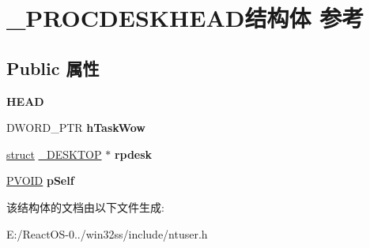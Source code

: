 \hypertarget{struct___p_r_o_c_d_e_s_k_h_e_a_d}{}\section{\+\_\+\+P\+R\+O\+C\+D\+E\+S\+K\+H\+E\+A\+D结构体 参考}
\label{struct___p_r_o_c_d_e_s_k_h_e_a_d}
\subsection*{Public 属性}
\begin{DoxyCompactItemize}
\item 
\mbox{\label{struct___p_r_o_c_d_e_s_k_h_e_a_d_a9e86ada3b28f85a06ca00e51e39e6fd1}} 
{\bfseries H\+E\+AD}
\item 
\mbox{\label{struct___p_r_o_c_d_e_s_k_h_e_a_d_a5e12ebcabd0f3be1d2986b40efa935cb}} 
D\+W\+O\+R\+D\+\_\+\+P\+TR {\bfseries h\+Task\+Wow}
\item 
\mbox{\label{struct___p_r_o_c_d_e_s_k_h_e_a_d_a5474d574fd388abdeabffde4ff783378}} 
\hyperlink{interfacestruct}{struct} \hyperlink{struct___d_e_s_k_t_o_p}{\+\_\+\+D\+E\+S\+K\+T\+OP} $\ast$ {\bfseries rpdesk}
\item 
\mbox{\label{struct___p_r_o_c_d_e_s_k_h_e_a_d_ac353848b02480bbd2b62c9f709c5686d}} 
\hyperlink{interfacevoid}{P\+V\+O\+ID} {\bfseries p\+Self}
\end{DoxyCompactItemize}


该结构体的文档由以下文件生成\+:\begin{DoxyCompactItemize}
\item 
E\+:/\+React\+O\+S-\/0../win32ss/include/ntuser.\+h\end{DoxyCompactItemize}
